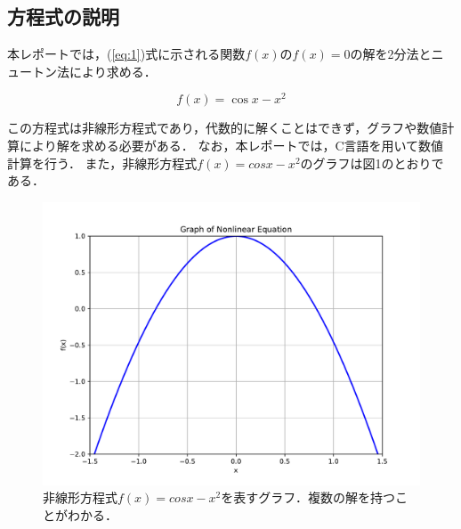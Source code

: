 \documentclass[uplatex]{jsarticle}
\begin{document}
\subsection{方程式の説明}

本レポートでは，(\ref{eq:1})式に示される関数$f(x)$の$f(x)=0$の解を2分法とニュートン法により求める．

\begin{equation}
f(x)=\cos x- x^2\label{eq:1}
\end{equation}


\indent
この方程式は非線形方程式であり，代数的に解くことはできず，グラフや数値計算により解を求める必要がある\cite{ref3}．
なお，本レポートでは，C言語を用いて数値計算を行う．
\indent
また，非線形方程式$f(x)=cos x- x^2$のグラフは図1のとおりである．
\begin{figure}[H]
	\centering
	\includegraphics[width=12cm]{./Figs/第6回課題.pdf}
	\caption{非線形方程式$f(x)=cos x- x^2$を表すグラフ．複数の解を持つことがわかる．}
	\label{fig:1}
\end{figure}
\end{document}
